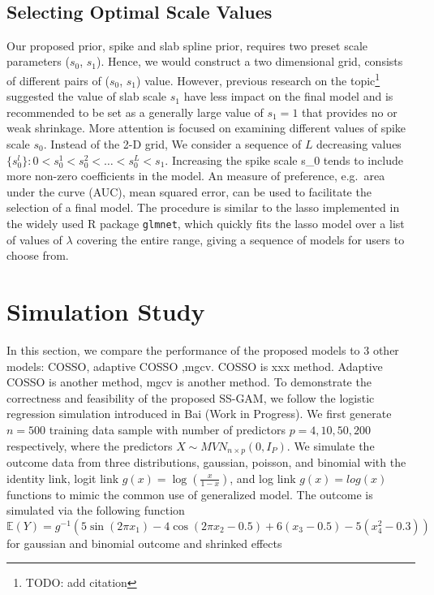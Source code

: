 \documentclass[AMA,STIX1COL,]{WileyNJD-v2}
\begin{document}
~

\hypertarget{selecting-optimal-scale-values}{%
\subsection{Selecting Optimal Scale
Values}\label{selecting-optimal-scale-values}}

Our proposed prior, spike and slab spline prior, requires two preset
scale parameters (\(s_0\), \(s_1\)). Hence, we would construct a two
dimensional grid, consists of different pairs of (\(s_0\), \(s_1\))
value. However, previous research on the topic\footnote{TODO: add
  citation} suggested the value of slab scale \(s_1\) have less impact
on the final model and is recommended to be set as a generally large
value of \(s_1 = 1\) that provides no or weak shrinkage. More attention
is focused on examining different values of spike scale \(s_0\). Instead
of the 2-D grid, We consider a sequence of \(L\) decreasing values
\(\{s_0^l\}: 0 < s_0^1 < s_0^2 < \dots < s_0^L < s_1\). Increasing the
spike scale s\_0 tends to include more non-zero coefficients in the
model. An measure of preference, e.g.~area under the curve (AUC), mean
squared error, can be used to facilitate the selection of a final model.
The procedure is similar to the lasso implemented in the widely used R
package \texttt{glmnet}, which quickly fits the lasso model over a list
of values of \(\lambda\) covering the entire range, giving a sequence of
models for users to choose from.

\hypertarget{simulation-study}{%
\section{Simulation Study}\label{simulation-study}}

In this section, we compare the performance of the proposed models to 3
other models: COSSO, adaptive COSSO ,mgcv. COSSO is xxx method. Adaptive
COSSO is another method, mgcv is another method. To demonstrate the
correctness and feasibility of the proposed SS-GAM, we follow the
logistic regression simulation introduced in Bai (Work in Progress). We
first generate \(n=500\) training data sample with number of predictors
\(p=4, 10, 50, 200\) respectively, where the predictors
\(X \sim MVN_{n\times p}(0, I_{P})\). We simulate the outcome data from
three distributions, gaussian, poisson, and binomial with the identity
link, logit link \(g(x) = \log(\frac{x}{1-x})\), and log link
\(g(x) = log(x)\) functions to mimic the common use of generalized
model. The outcome is simulated via the following function \[
\mathbb{E}(Y) = g^{-1}(5 \sin(2\pi x_1) - 4 \cos(2\pi x_2 -0.5) + 6(x_3-0.5) - 5(x_4^2 -0.3))
\] for gaussian and binomial outcome and shrinked effects
\end{document}
